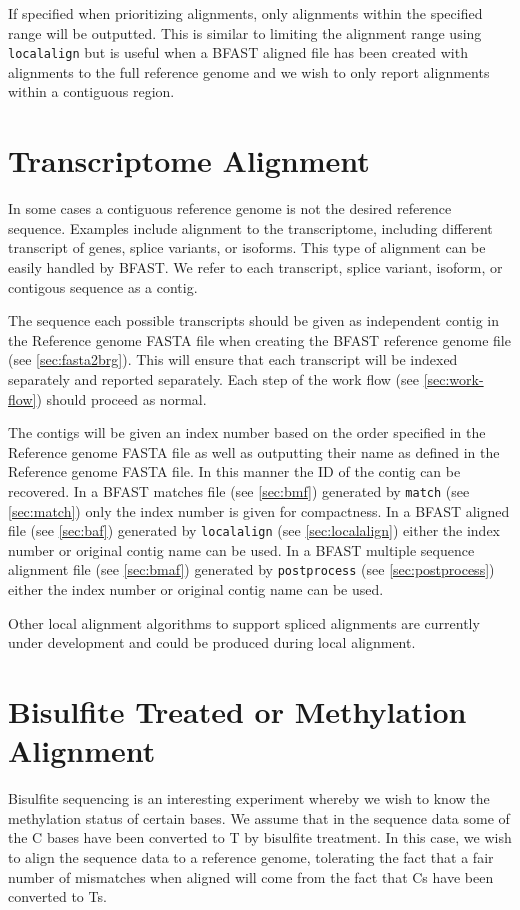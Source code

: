 \documentclass[a4paper,12pt]{book}
\newcommand{\TT}[1]{{\tt #1}} %
\newcommand{\RGFF}{Reference genome FASTA file}
\newcommand{\BRGF}{BFAST reference genome file} %
\newcommand{\BMF}{BFAST matches file} %
\newcommand{\BAF}{BFAST aligned file} %
\newcommand{\BMAF}{BFAST multiple sequence alignment file} %
\begin{document}
If specified when prioritizing alignments, only alignments within the specified range will be outputted.
This is similar to limiting the alignment range using \TT{localalign} but is useful when a \BAF{} has been created with alignments to the full reference genome and we wish to only report alignments within a contiguous region.

\section{Transcriptome Alignment}
\label{sec:transcriptome}
In some cases a contiguous reference genome is not the desired reference sequence.
Examples include alignment to the transcriptome, including different transcript of genes, splice variants, or isoforms.
This type of alignment can be easily handled by BFAST.
We refer to each transcript, splice variant, isoform, or contigous sequence as a contig.

The sequence each possible transcripts should be given as independent contig in the \RGFF{} when creating the \BRGF{} (see \autoref{sec:fasta2brg}).
This will ensure that each transcript will be indexed separately and reported separately.
Each step of the work flow (see \autoref{sec:work-flow}) should proceed as normal.

The contigs will be given an index number based on the order specified in the \RGFF{} as well as outputting their name as defined in the \RGFF{}.
In this manner the ID of the contig can be recovered.
In a \BMF{} (see \autoref{sec:bmf}) generated by \TT{match} (see \autoref{sec:match}) only the index number is given for compactness.
In a \BAF{} (see \autoref{sec:baf}) generated by \TT{localalign} (see \autoref{sec:localalign}) either the index number or original contig name can be used.
In a \BMAF{} (see \autoref{sec:bmaf}) generated by \TT{postprocess} (see \autoref{sec:postprocess}) either the index number or original contig name can be used.

Other local alignment algorithms to support spliced alignments are currently under development and could be produced during local alignment.

\section{Bisulfite Treated or Methylation Alignment}
Bisulfite sequencing is an interesting experiment whereby we wish to know the methylation status of certain bases.
We assume that in the sequence data some of the C bases have been converted to T by bisulfite treatment.
In this case, we wish to align the sequence data to a reference genome, tolerating the fact that a fair number of mismatches when aligned will come from the fact that Cs have been converted to Ts.
\end{document}
